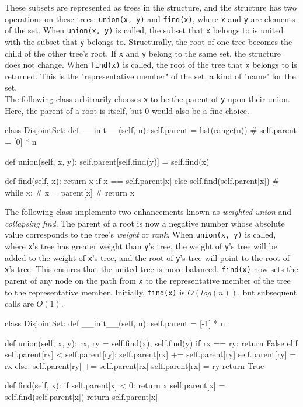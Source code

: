 \documentclass[12pt]{article}
\begin{document}
These subsets are represented as trees in the structure, and the structure has two operations on these trees: \texttt{union(x, y)} and \texttt{find(x)}, where \texttt{x} and \texttt{y} are elements of the set. When \texttt{union(x, y)} is called, the subset that \texttt{x} belongs to is united with the subset that \texttt{y} belongs to. Structurally, the root of one tree becomes the child of the other tree's root. If \texttt{x} and \texttt{y} belong to the same set, the structure does not change. When \texttt{find(x)} is called, the root of the tree that \texttt{x} belongs to is returned. This is the "representative member" of the set, a kind of "name" for the set. \\

The following class arbitrarily chooses \texttt{x} to be the parent of \texttt{y} upon their union. Here, the parent of a root is itself, but $0$ would also be a fine choice.
\medskip
\begin{python}
class DisjointSet:
    def __init__(self, n):
        self.parent = list(range(n))
        # self.parent = [0] * n

    def union(self, x, y):
        self.parent[self.find(y)] = self.find(x)

    def find(self, x):
        return x if x == self.parent[x] else self.find(self.parent[x])
        # while x:
        #     x = parent[x]
        # return x
\end{python}
\bigskip

The following class implements two enhancements known as \textit{weighted union} and \textit{collapsing find}. The parent of a root is now a negative number whose absolute value corresponds to the tree's \textit{weight} or \textit{rank}. When \texttt{union(x, y)} is called, where \texttt{x}'s tree has greater weight than \texttt{y}'s tree, the weight of \texttt{y}'s tree will be added to the weight of \texttt{x}'s tree, and the root of \texttt{y}'s tree will point to the root of \texttt{x}'s tree. This ensures that the united tree is more balanced. \texttt{find(x)} now sets the parent of any node on the path from \texttt{x} to the representative member of the tree to the representative member. Initially, \texttt{find(x)} is $O(log(n))$, but subsequent calls are $O(1)$.
\medskip
\begin{python}
class DisjointSet:
    def __init__(self, n):
        self.parent = [-1] * n

    def union(self, x, y):
        rx, ry = self.find(x), self.find(y)
        if rx == ry:
            return False
        elif self.parent[rx] < self.parent[ry]:
            self.parent[rx] += self.parent[ry]
            self.parent[ry] = rx
        else:
            self.parent[ry] += self.parent[rx]
            self.parent[rx] = ry
        return True

    def find(self, x):
        if self.parent[x] < 0:
            return x
        self.parent[x] = self.find(self.parent[x])
        return self.parent[x]
\end{python}
\end{document}
